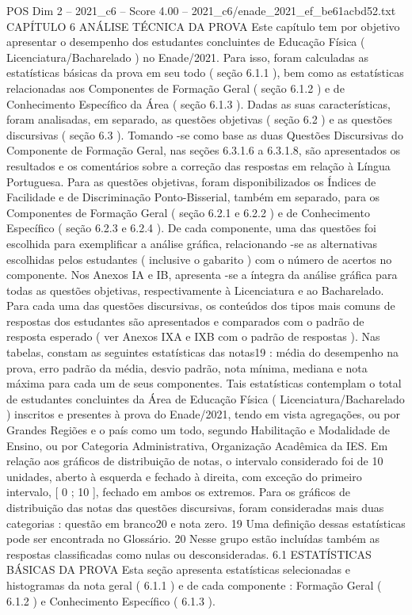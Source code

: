 \begin{textsample}{POS Dim 2 – 2021\_c6 – Score 4.00 – 2021\_c6/enade\_2021\_ef\_be61acbd52.txt}  \label{ex:f2_pos_173}
CAPÍTULO 6 ANÁLISE TÉCNICA DA PROVA Este capítulo tem por objetivo apresentar o desempenho dos estudantes concluintes de Educação Física ( Licenciatura/Bacharelado ) no Enade/2021.
Para isso, foram calculadas as estatísticas básicas da prova em seu todo ( seção 6.1.1 ), bem como as estatísticas relacionadas aos Componentes de Formação Geral ( seção 6.1.2 ) e de Conhecimento Específico da Área ( seção 6.1.3 ).
Dadas as suas características, foram analisadas, em separado, as questões objetivas ( seção 6.2 ) e as questões discursivas ( seção 6.3 ).
Tomando -se como base as duas Questões Discursivas do Componente de Formação Geral, nas seções 6.3.1.6 a 6.3.1.8, são apresentados os resultados e os comentários sobre a correção das respostas em relação à Língua Portuguesa.
Para as questões objetivas, foram disponibilizados os Índices de Facilidade e de Discriminação Ponto-Bisserial, também em separado, para os Componentes de Formação Geral ( seção 6.2.1 e 6.2.2 ) e de Conhecimento Específico ( seção 6.2.3 e 6.2.4 ).
De cada componente, uma das questões foi escolhida para exemplificar a análise gráfica, relacionando -se as alternativas escolhidas pelos estudantes ( inclusive o gabarito ) com o número de acertos no componente.
Nos Anexos IA e IB, apresenta -se a íntegra da análise gráfica para todas as questões objetivas, respectivamente à Licenciatura e ao Bacharelado.
Para cada uma das questões discursivas, os conteúdos dos tipos mais comuns de respostas dos estudantes são apresentados e comparados com o padrão de resposta esperado ( ver Anexos IXA e IXB com o padrão de respostas ).
Nas tabelas, constam as seguintes estatísticas das notas19 : média do desempenho na prova, erro padrão da média, desvio padrão, nota mínima, mediana e nota máxima para cada um de seus componentes.
Tais estatísticas contemplam o total de estudantes concluintes da Área de Educação Física ( Licenciatura/Bacharelado ) inscritos e presentes à prova do Enade/2021, tendo em vista agregações, ou por Grandes Regiões e o país como um todo, segundo Habilitação e Modalidade de Ensino, ou por Categoria Administrativa, Organização Acadêmica da IES.
Em relação aos gráficos de distribuição de notas, o intervalo considerado foi de 10 unidades, aberto à esquerda e fechado à direita, com exceção do primeiro intervalo, [ 0 ; 10 ], fechado em ambos os extremos.
Para os gráficos de distribuição das notas das questões discursivas, foram consideradas mais duas categorias : questão em branco20 e nota zero. 19 Uma definição dessas estatísticas pode ser encontrada no Glossário. 20 Nesse grupo estão incluídas também as respostas classificadas como nulas ou desconsideradas. 6.1 ESTATÍSTICAS BÁSICAS DA PROVA Esta seção apresenta estatísticas selecionadas e histogramas da nota geral ( 6.1.1 ) e de cada componente : Formação Geral ( 6.1.2 ) e Conhecimento Específico ( 6.1.3 ).

\end{textsample}
